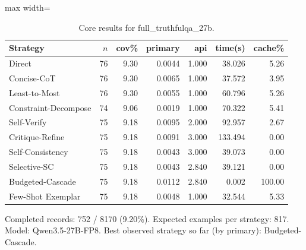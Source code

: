 \documentclass[10pt,twocolumn]{article}
\begin{document}
\begin{table}[t]
\centering
\caption{Core results for full\_truthfulqa\_27b.}
\label{tab:full_truthfulqa_27b_core}
\begin{adjustbox}{max width=\textwidth}
\begin{tabular}{lrrrrrr}
\toprule
Strategy & $n$ & cov\% & primary & api & time(s) & cache\% \\
\midrule
Direct & 76 & 9.30 & 0.0044 & 1.000 & 38.026 & 5.26 \\
Concise-CoT & 76 & 9.30 & 0.0065 & 1.000 & 37.572 & 3.95 \\
Least-to-Most & 76 & 9.30 & 0.0055 & 1.000 & 60.796 & 5.26 \\
Constraint-Decompose & 74 & 9.06 & 0.0019 & 1.000 & 70.322 & 5.41 \\
Self-Verify & 75 & 9.18 & 0.0095 & 2.000 & 92.957 & 2.67 \\
Critique-Refine & 75 & 9.18 & 0.0091 & 3.000 & 133.494 & 0.00 \\
Self-Consistency & 75 & 9.18 & 0.0043 & 3.000 & 39.073 & 0.00 \\
Selective-SC & 75 & 9.18 & 0.0043 & 2.840 & 39.121 & 0.00 \\
Budgeted-Cascade & 75 & 9.18 & 0.0112 & 2.840 & 0.002 & 100.00 \\
Few-Shot Exemplar & 75 & 9.18 & 0.0048 & 1.000 & 32.544 & 5.33 \\
\bottomrule
\end{tabular}
\end{adjustbox}
\vspace{2pt}\parbox{0.98\textwidth}{\footnotesize Completed records: 752 / 8170 (9.20\%). Expected examples per strategy: 817. Model: Qwen3.5-27B-FP8. Best observed strategy so far (by primary): Budgeted-Cascade.}
\end{table}
\end{document}
